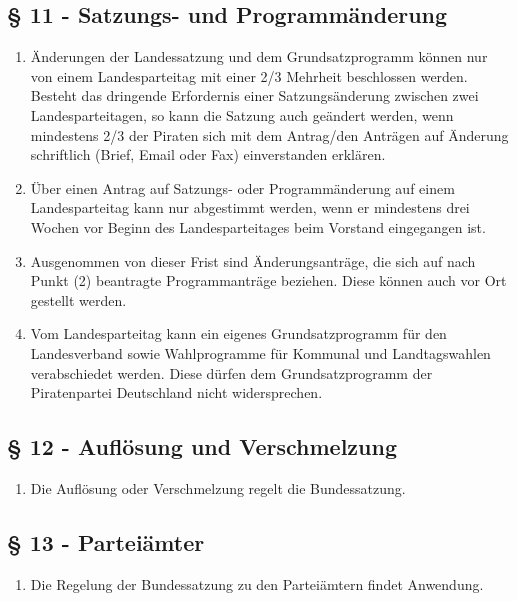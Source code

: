 \subsection{§ 11 - Satzungs- und Programmänderung}
\begin{enumerate}
\item Änderungen der Landessatzung und dem Grundsatzprogramm können nur von
einem Landesparteitag mit einer 2/3 Mehrheit beschlossen werden. Besteht das
dringende Erfordernis einer Satzungsänderung zwischen zwei Landesparteitagen, so
kann die Satzung auch geändert werden, wenn mindestens 2/3 der Piraten sich mit
dem Antrag/den Anträgen auf Änderung schriftlich (Brief, Email oder Fax)
einverstanden erklären.

\item Über einen Antrag auf Satzungs- oder Programmänderung auf einem
Landesparteitag kann nur abgestimmt werden, wenn er mindestens drei Wochen vor
Beginn des Landesparteitages beim Vorstand eingegangen ist.

\item Ausgenommen von dieser Frist sind Änderungsanträge, die sich auf nach
Punkt (2) beantragte Programmanträge beziehen. Diese können auch vor Ort
gestellt werden.

\item Vom Landesparteitag kann ein eigenes Grundsatzprogramm für den
Landesverband sowie Wahlprogramme für Kommunal und Landtagswahlen verabschiedet
werden. Diese dürfen dem Grundsatzprogramm der Piratenpartei Deutschland nicht
widersprechen.
\end{enumerate}

\subsection{§ 12 - Auflösung und Verschmelzung}
\begin{enumerate}
\item Die Auflösung oder Verschmelzung regelt die Bundessatzung. 
\end{enumerate}

\subsection{§ 13 - Parteiämter}
\begin{enumerate}
\item Die Regelung der Bundessatzung zu den Parteiämtern findet Anwendung. 
\end{enumerate}


